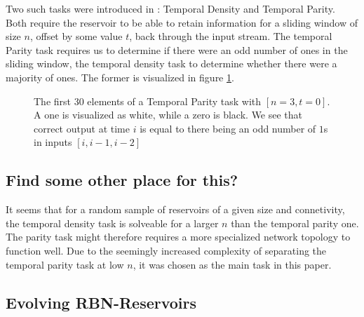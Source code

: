 Two such tasks were introduced in \cite{rbn-reservoir}: Temporal Density and Temporal Parity.
Both require the reservoir to be able to retain information for a sliding window of size $ n $,
offset by some value $ t $, back through the input stream.
The temporal Parity task requires us to determine if there were an odd number of ones in the sliding window,
the temporal density task to determine whether there were a majority of ones.
The former is visualized in figure \ref{figure:temporal-parity}.

\begin{figure}


  \caption{
    The first 30 elements of a Temporal Parity task with $[n=3, t=0]$.
    A one is visualized as white, while a zero is black.
    We see that correct output at time $i$ is equal to there being an odd number of $1$s in inputs $[i, i-1, i-2]$
  }
  \label{figure:temporal-parity}
\end{figure}

\subsection{Find some other place for this?}

It seems that for a random sample of reservoirs of a given size and connetivity,
the temporal density task is solveable for a larger $ n $ than the temporal parity one.
The parity task might therefore requires a more specialized network topology to function well.
Due to the seemingly increased complexity of separating the temporal parity task at low $ n $,
it was chosen as the main task in this paper.


\subsection{Evolving RBN-Reservoirs}

